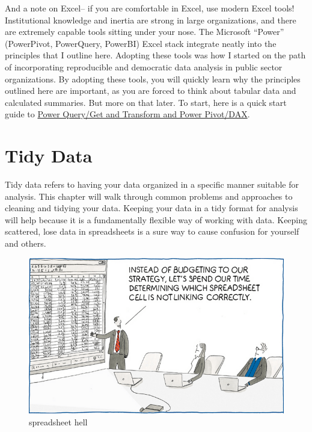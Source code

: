 \documentclass[
]{book}
\begin{document}
And a note on Excel-- if you are comfortable in Excel, use modern Excel tools! Institutional knowledge and inertia are strong in large organizations, and there are extremely capable tools sitting under your nose. The Microsoft ``Power'' (PowerPivot, PowerQuery, PowerBI) Excel stack integrate neatly into the principles that I outline here. Adopting these tools was how I started on the path of incorporating reproducible and democratic data analysis in public sector organizations. By adopting these tools, you will quickly learn why the principles outlined here are important, as you are forced to think about tabular data and calculated summaries. But more on that later. To start, here is a quick start guide to \href{https://support.office.com/en-us/article/get-started-with-power-pivot-in-microsoft-excel-fdfcf944-7876-424a-8437-1a6c1043a80b}{Power Query/Get and Transform and Power Pivot/DAX}.

\hypertarget{tidy-data}{%
\chapter{Tidy Data}\label{tidy-data}}

Tidy data refers to having your data organized in a specific manner suitable for analysis. This chapter will walk through common problems and approaches to cleaning and tidying your data. Keeping your data in a tidy format for analysis will help because it is a fundamentally flexible way of working with data. Keeping scattered, lose data in spreadsheets is a sure way to cause confusion for yourself and others.

\begin{figure}
\centering
\includegraphics{images/spreadsheet_hell.png}
\caption{spreadsheet hell}
\end{figure}
\end{document}
